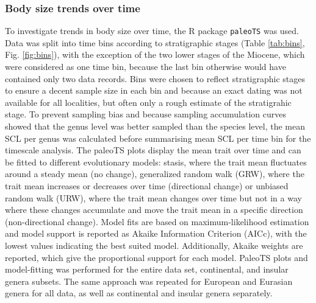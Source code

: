 \subsubsection{Body size trends over time}
To investigate trends in body size over time, the R package \texttt{paleoTS} \citep{Hunt2015a} was used. Data was split into time bins according to stratigraphic stages (Table \ref{tab:bins}, Fig. \ref{fig:bins}), with the exception of the two lower stages of the Miocene, which were considered as one time bin, because the last bin otherwise would have contained only two data records. Bins were chosen to reflect stratigraphic stages to ensure a decent sample size in each bin and because an exact dating was not available for all localities, but often only a rough estimate of the stratigrahic stage.
To prevent sampling bias and because sampling accumulation curves showed that the genus level was better sampled than the species level, the mean SCL per genus was calculated before summarising mean SCL per time bin for the timescale analysis. The paleoTS plots display the mean trait over time and can be fitted to different evolutionary models: stasis, where the trait mean fluctuates around a steady mean (no change), generalized random walk (GRW), where the trait mean increases or decreases over time (directional change) or unbiased random walk (URW), where the trait mean changes over time but not in a way where these changes accumulate and move the trait mean in a specific direction (non-directional change). Model fits are based on maximum-likelihood estimation and model support is reported as Akaike Information Criterion (AICc), with the lowest values indicating the best suited model. Additionally, Akaike weights are reported, which give the proportional support for each model. PaleoTS plots and model-fitting was performed for the entire data set, continental, and insular genera subsets. The same approach was repeated for European and Eurasian genera for all data, as well as continental and insular genera separately.

